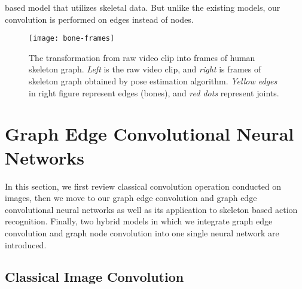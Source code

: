 \documentclass[a4paper,11pt]{article}
\begin{document}
based model that utilizes skeletal data. But unlike the existing models, our convolution is performed on edges instead of nodes.
 
\begin{figure}
\centering
\texttt{[image: bone-frames]}
\caption{The transformation from raw video clip into frames of human skeleton graph. {\it Left} is the raw video clip, and {\it right} is frames of skeleton graph obtained by pose estimation algorithm. {\it Yellow edges} in right figure represent edges (bones), and {\it red dots} represent joints.}
\label{fig:example}
\end{figure}




\section{Graph Edge Convolutional Neural Networks}

In this section, we first review classical convolution operation conducted on images, then we move to our graph edge convolution and graph edge convolutional neural networks as well as its application to skeleton based action recognition. Finally, two hybrid models in which we integrate graph edge convolution and graph node convolution into one single neural network are introduced.





\subsection{Classical Image Convolution}
\end{document}

